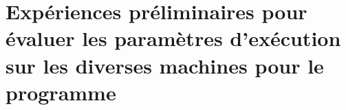 
\chapter{Expériences préliminaires pour évaluer les paramètres
d'exécution sur les diverses machines pour le programme
}

\label{wordcount-java.ann}



